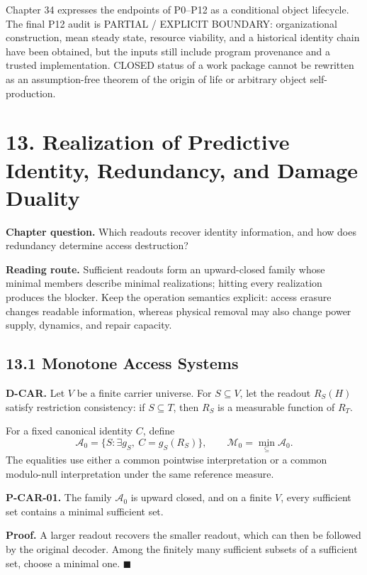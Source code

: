 \documentclass[
  english,
  11pt,
  oneside]{book}
\begin{document}
Chapter 34 expresses the endpoints of P0--P12 as a conditional object lifecycle. The final P12 audit is PARTIAL / EXPLICIT BOUNDARY: organizational construction, mean steady state, resource viability, and a historical identity chain have been obtained, but the inputs still include program provenance and a trusted implementation. CLOSED status of a work package cannot be rewritten as an assumption-free theorem of the origin of life or arbitrary object self-production.

\chapter{13. Realization of Predictive Identity, Redundancy, and Damage Duality}\label{ch-13}

\textbf{Chapter question.} Which readouts recover identity information, and how does redundancy determine access destruction?

\textbf{Reading route.} Sufficient readouts form an upward-closed family whose minimal members describe minimal realizations; hitting every realization produces the blocker. Keep the operation semantics explicit: access erasure changes readable information, whereas physical removal may also change power supply, dynamics, and repair capacity.

\section{13.1 Monotone Access Systems}\label{monotone-access-systems}

\textbf{D-CAR.} Let \(V\) be a finite carrier universe. For \(S\subseteq V\), let the readout \(R_S(H)\) satisfy restriction consistency: if \(S\subseteq T\), then \(R_S\) is a measurable function of \(R_T\).

For a fixed canonical identity \(C\), define \[\mathcal A_0=\{S:\exists g_S,\ C=g_S(R_S)\},
\qquad
\mathcal M_0=\min_{\subseteq}\mathcal A_0.\] The equalities use either a common pointwise interpretation or a common modulo-null interpretation under the same reference measure.

\hypertarget{p-car-01}{}\label{p-car-01}

\textbf{P-CAR-01.} The family \(\mathcal A_0\) is upward closed, and on a finite \(V\), every sufficient set contains a minimal sufficient set.

\textbf{Proof.} A larger readout recovers the smaller readout, which can then be followed by the original decoder. Among the finitely many sufficient subsets of a sufficient set, choose a minimal one. \(\blacksquare\)
\end{document}
